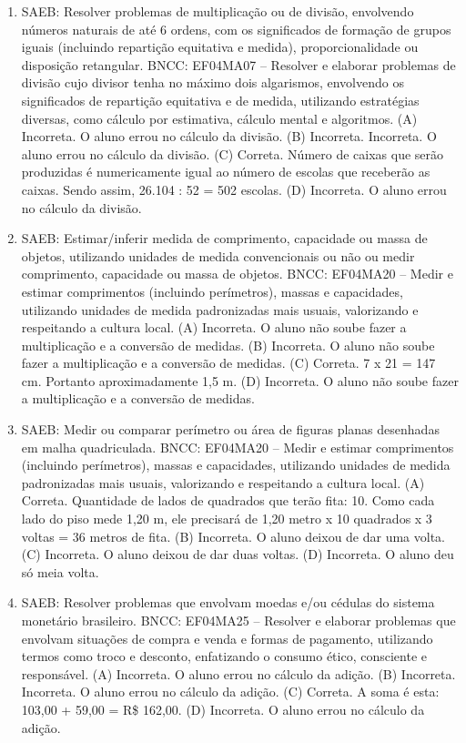\begin{enumerate}
\item
SAEB: Resolver problemas de multiplicação ou de divisão,
envolvendo números naturais de até 6 ordens, com os significados de
formação de grupos iguais (incluindo repartição equitativa e medida),
proporcionalidade ou disposição retangular.
BNCC: EF04MA07 -- Resolver e elaborar problemas de divisão cujo divisor tenha no máximo dois algarismos,
envolvendo os significados de repartição equitativa e de medida, utilizando estratégias diversas,
como cálculo por estimativa, cálculo mental e algoritmos.
(A) Incorreta. O aluno errou no cálculo da divisão.
(B) Incorreta. Incorreta. O aluno errou no cálculo da divisão.
(C) Correta. Número de caixas que serão produzidas é numericamente igual ao número de
escolas que receberão as caixas. Sendo assim, 26.104 : 52 = 502 escolas.
(D) Incorreta. O aluno errou no cálculo da divisão.

\item
SAEB: Estimar/inferir medida de comprimento, capacidade ou
massa de objetos, utilizando unidades de medida convencionais ou não ou
medir comprimento, capacidade ou massa de objetos.
BNCC: EF04MA20 -- Medir e estimar comprimentos (incluindo perímetros), massas e capacidades, utilizando
unidades de medida padronizadas mais usuais, valorizando e respeitando a cultura local.
(A) Incorreta. O aluno não soube fazer a multiplicação e a conversão de medidas.
(B) Incorreta. O aluno não soube fazer a multiplicação e a conversão de medidas.
(C) Correta. 7 x 21 = 147 cm. Portanto aproximadamente 1,5 m.
(D) Incorreta. O aluno não soube fazer a multiplicação e a conversão de medidas.

\item
SAEB: Medir ou comparar perímetro ou área de figuras planas
desenhadas em malha quadriculada.
BNCC: EF04MA20 -- Medir e estimar comprimentos (incluindo perímetros), massas e capacidades, utilizando
unidades de medida padronizadas mais usuais, valorizando e respeitando a cultura local.
(A) Correta. Quantidade de lados de quadrados que terão fita: 10. Como cada lado do piso mede 1,20 m, ele precisará de 1,20 metro x 10 quadrados x 3 voltas = 36 metros de fita.
(B) Incorreta. O aluno deixou de dar uma volta.
(C) Incorreta. O aluno deixou de dar duas voltas.
(D) Incorreta. O aluno deu só meia volta.

\item
SAEB: Resolver problemas que envolvam moedas e/ou cédulas do
sistema monetário brasileiro.
BNCC: EF04MA25 -- Resolver e elaborar problemas que envolvam situações de compra e venda e formas
de pagamento, utilizando termos como troco e desconto, enfatizando o consumo ético, consciente e
responsável.
(A) Incorreta. O aluno errou no cálculo da adição.
(B) Incorreta. Incorreta. O aluno errou no cálculo da adição.
(C) Correta. A soma é esta: 103,00 + 59,00 = R\$ 162,00.
(D) Incorreta. O aluno errou no cálculo da adição.


\end{enumerate}
